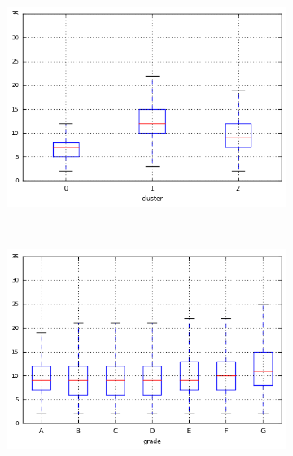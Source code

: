 \begin{anexosenv}
\begin{figure}[t!]
\begin{subfigure}[t]{0.45\textwidth}
            \centerline{\includegraphics[width=1\textwidth]{img/open_acc_by_cluster}}
        \end{subfigure}%
        ~ 
        \begin{subfigure}[t]{0.45\textwidth}
            \centering
   
            \centerline{\includegraphics[width=1\textwidth]{img/open_acc_by_grade}}

        \end{subfigure}
        \\
                \caption{\emph{Boxplots} de pub\textunderscore rec}
        \begin{subfigure}[t]{0.45\textwidth}
            \centering


\end{subfigure}
\end{figure}
\end{anexosenv}
